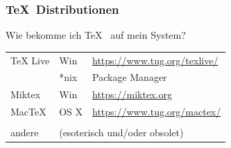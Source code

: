 \documentclass{beamer}                %
\def\tikzrarrow{%
    \tikz[baseline=-0.67ex]\draw[double,very thick,-{stealth}](0,0)--(0.5,0);}
\begin{document}
\begin{frame} %
    \frametitle{\TeX~Distributionen}

    Wie bekomme ich \TeX~ auf mein System?\\[2mm]

    \begin{center}
        \begin{tabular}{lll}
            TeX Live                                                          & 
            Win                                                               & 
            \href{https://www.tug.org/texlive/}{https://www.tug.org/texlive/} \\

                                                                              &
            *nix                                                              &
            Package Manager                                                   \\

            Miktex                                                            &
            Win                                                               & 
            \href{https://miktex.org}{https://miktex.org}                     \\

            MacTeX                                                            & 
            OS X                                                              & 
            \href{https://www.tug.org/mactex/}{https://www.tug.org/mactex/}   \\

            \\

            \textcolor{solarized-base0}{andere}                               & 
            \multicolumn{2}{l}{%
                \textcolor{solarized-base0}{(esoterisch und/oder obsolet)}}   \\
        \end{tabular}

    \end{center}
\end{frame}
\end{document}
